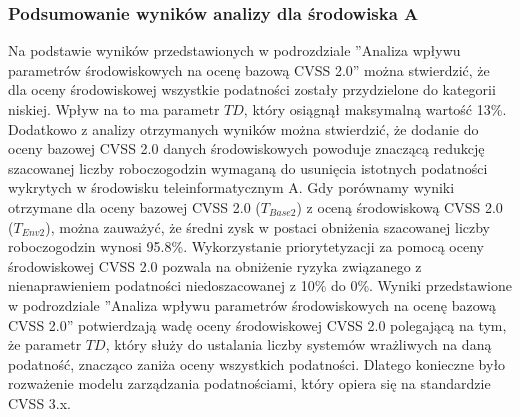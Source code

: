 

\subsubsection{Podsumowanie wyników analizy dla środowiska A}
Na podstawie wyników przedstawionych w podrozdziale ''Analiza wpływu parametrów środowiskowych na ocenę bazową CVSS 2.0'' można stwierdzić, że dla oceny środowiskowej wszystkie podatności zostały przydzielone do kategorii niskiej. Wpływ na to ma parametr $TD$, który osiągnął maksymalną wartość 13\%. Dodatkowo z analizy otrzymanych wyników można stwierdzić, że dodanie do oceny bazowej CVSS 2.0 danych środowiskowych powoduje znaczącą redukcję szacowanej liczby roboczogodzin wymaganą do usunięcia istotnych podatności wykrytych w środowisku teleinformatycznym A. Gdy porównamy wyniki otrzymane dla oceny bazowej CVSS 2.0 ($T_{Base2}$) z oceną środowiskową CVSS 2.0 ($T_{Env2}$), można zauważyć, że średni zysk w postaci obniżenia szacowanej liczby roboczogodzin wynosi 95.8\%. Wykorzystanie priorytetyzacji za pomocą oceny środowiskowej CVSS 2.0 pozwala na obniżenie ryzyka związanego z nienaprawieniem podatności niedoszacowanej z 10\% do 0\%. Wyniki przedstawione w podrozdziale ''Analiza wpływu parametrów środowiskowych na ocenę bazową CVSS 2.0'' potwierdzają wadę oceny środowiskowej CVSS 2.0 polegającą na tym, że parametr $TD$, który służy do ustalania liczby systemów wrażliwych na daną podatność, znacząco zaniża oceny wszystkich podatności. Dlatego konieczne było rozważenie modelu zarządzania podatnościami, który opiera się na standardzie CVSS 3.x.

